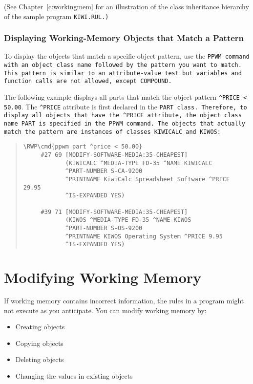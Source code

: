 (See Chapter~\ref{c:workingmem} for an illustration of the class
inheritance hierarchy of the sample program \tt{KIWI.RUL}.)

\subsubsection{Displaying Working-Memory Objects that Match a Pattern}

To display the objects that match a specific object pattern, use the
\tt{PPWM} command with an object class name followed by the pattern
you want to match. This pattern is similar to an attribute-value test
but variables and function calls are not allowed, except
\tt{COMPOUND}.

The following example displays all parts that match the object pattern
\verb|^PRICE < 50.00|. The \verb|^PRICE| attribute is first declared
in the \tt{PART} class. Therefore, to display all objects that have
the \verb|^PRICE| attribute, the object class name \tt{PART} is
specified in the \tt{PPWM} command. The objects that actually match
the pattern are instances of classes \tt{KIWICALC} and \tt{KIWOS}:
\begin{quote}
\begin{Verbatim}[commandchars=\\\{\}]
\RWP\cmd{ppwm part ^price < 50.00}
     #27 69 [MODIFY-SOFTWARE-MEDIA:35-CHEAPEST]
            (KIWICALC ^MEDIA-TYPE FD-35 ^NAME KIWICALC 
            ^PART-NUMBER S-CA-9200
            ^PRINTNAME KiwiCalc Spreadsheet Software ^PRICE 29.95
            ^IS-EXPANDED YES)

     #39 71 [MODIFY-SOFTWARE-MEDIA:35-CHEAPEST]
            (KIWOS ^MEDIA-TYPE FD-35 ^NAME KIWOS 
            ^PART-NUMBER S-OS-9200
            ^PRINTNAME KIWOS Operating System ^PRICE 9.95
            ^IS-EXPANDED YES)
\end{Verbatim}
\end{quote}

\section{Modifying Working Memory}

If working memory contains incorrect information, the rules in a
program might not execute as you anticipate. You can modify
working memory by:

\begin{itemize}
  \item Creating objects
  \item Copying objects
  \item Deleting objects
  \item Changing the values in existing objects
\end{itemize}

